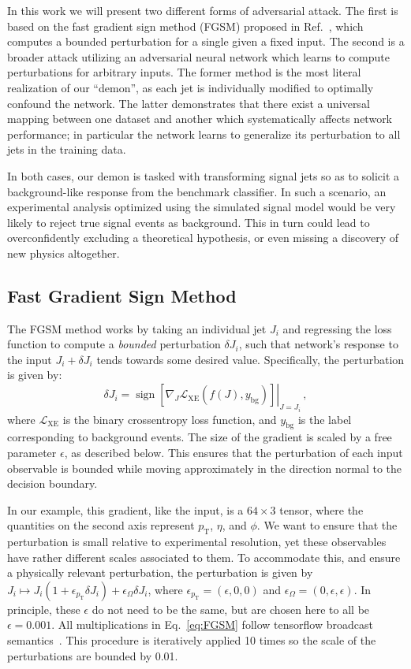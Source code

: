 \documentclass[reprint,nofootinbib,...]{revtex4-1}
\DeclareMathOperator{\sign}{sign}
\newcommand{\nconst}{64}       %
\newcommand{\pt}{p_\mathrm{T}} %
\begin{document}
In this work we will present two different forms of adversarial attack.
The first is based on the fast gradient sign method (FGSM) proposed in Ref.~\cite{DBLP:journals/corr/GoodfellowSS14}, which computes a bounded perturbation for a single given a fixed input.
The second is a broader attack utilizing an adversarial neural network which learns to compute perturbations for arbitrary inputs.
The former method is the most literal realization of our ``demon'', as each jet is individually modified to optimally confound the network.
The latter demonstrates that there exist a universal mapping between one dataset and another which systematically affects network performance; in particular the network learns to generalize its perturbation to all jets in the training data.

In both cases, our demon is tasked with transforming signal jets so as to solicit a background-like response from the benchmark classifier.
In such a scenario, an experimental analysis optimized using the simulated signal model would be very likely to reject true signal events as background.
This in turn could lead to overconfidently excluding a theoretical hypothesis, or even missing a discovery of new physics altogether.

\subsection{Fast Gradient Sign Method}
\label{subsec:fgsm}
The FGSM method works by taking an individual jet $J_i$ and regressing the loss function to compute a \textit{bounded} perturbation $\delta J_i$, such that network's response to the input $J_i + \delta J_i$ tends towards some desired value.
Specifically, the perturbation is given by:
\begin{equation}
\label{eq:FGSM}
\delta J_i = \left.\sign\left[\nabla_{J} \mathcal{L}_\text{XE}\left(f(J), y_\mathrm{bg}\right)\right]\right\rvert_{J=J_i} \,,
\end{equation}
where $\mathcal{L}_\text{XE}$ is the binary crossentropy loss function, and $y_\mathrm{bg}$ is the label corresponding to background events.  The size of the gradient is scaled by a free parameter $\epsilon$, as described below.  This ensures that the perturbation of each input observable is bounded while moving approximately in the direction normal to the decision boundary. 

In our example, this gradient, like the input, is a $\nconst\times3$ tensor, where the quantities on the second axis represent $\pt$, $\eta$, and $\phi$.
We want to ensure that the perturbation is small relative to experimental resolution, yet these observables have rather different scales associated to them.
To accommodate this, and ensure a physically relevant perturbation, the perturbation is given by $J_i\mapsto J_i(1+\epsilon_{\pt}\delta J_i)+\epsilon_\Omega\delta J_i$, where $\epsilon_{\pt}=(\epsilon,0,0)$ and $\epsilon_\Omega=(0,\epsilon,\epsilon)$.  In principle, these $\epsilon$ do not need to be the same, but are chosen here to all be $\epsilon=0.001$.   All multiplications in Eq.~\ref{eq:FGSM} follow tensorflow broadcast semantics~\cite{tensorflow}.  This procedure is iteratively applied 10 times so the scale of the perturbations are bounded by 0.01.
\end{document}
